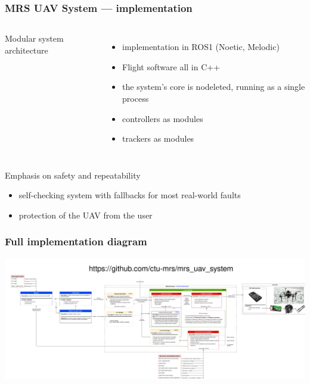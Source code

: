 \documentclass[aspectratio=169]{beamer}
\begin{document}
\begin{frame}
\frametitle{MRS UAV System --- implementation}

\begin{columns}[c]


\begin{block}{Modular system architecture}
  \begin{adjustbox}{max totalsize={1.0\textwidth}{.65\textheight}, center}
    
  \end{adjustbox}
\end{block}


\begin{itemize}
  \item implementation in ROS1 (Noetic, Melodic)
  \item Flight software all in C++
  \item the system's core is nodeleted, running as a single process
  \item controllers as modules
  \item trackers as modules
\end{itemize}

\end{columns}

\begin{block}{Emphasis on safety and repeatability}
  \begin{itemize}
    \item self-checking system with fallbacks for most real-world faults
    \item protection of the UAV from the user
  \end{itemize}
\end{block}

\end{frame}

\begin{frame}
\frametitle{Full implementation diagram}

  \includegraphics[width=1.0\textwidth]{./fig/full_diagram.jpg}

\end{frame}
\end{document}
